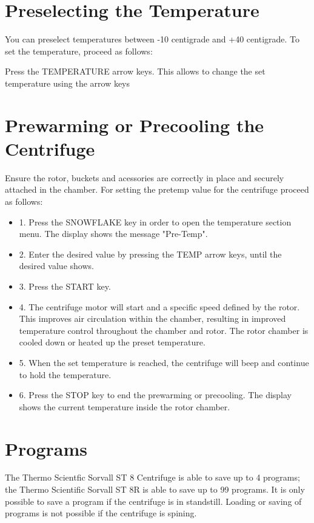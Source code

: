 \documentclass[12pt]{../SOP3_beta}
\begin{document}
\section{Preselecting the Temperature}

\NP You can preselect temperatures between -10 centigrade and +40 centigrade. To set the temperature, proceed as follows:

\NP Press the TEMPERATURE arrow keys. This allows to change the set temperature using the arrow keys 

\section{Prewarming or Precooling the Centrifuge}

\NP Ensure the rotor, buckets and acessories are correctly in place and securely attached in the chamber. For setting the pretemp value for the centrifuge proceed as follows: 

\begin{itemize}
  \item 1. Press the SNOWFLAKE key in order to open the temperature section menu. The display shows the message "Pre-Temp".
  \item 2. Enter the desired value by pressing the TEMP arrow keys, until the desired value shows.
  \item 3. Press the START key.
  \item 4. The centrifuge motor will start and a specific speed defined by the rotor. This improves air circulation within the chamber, resulting in improved temperature control throughout the chamber and rotor. The rotor chamber is cooled down or heated up the preset temperature. 
  \item 5. When the set temperature is reached, the centrifuge will beep and continue to hold the temperature.  
  \item 6. Press the STOP key to end the prewarming or precooling. The display shows the current temperature inside the rotor chamber. 
\end{itemize}


\section{Programs}

\NP The Thermo Scientfic Sorvall ST 8 Centrifuge is able to save up to 4 programs; the Thermo Scientific Sorvall ST 8R is able to save up to 99 programs. It is only possible to save a program if the centrifuge is in standstill. Loading or saving of programs is not possible if the centrifuge is spining. 
\end{document}
